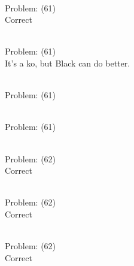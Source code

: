 \documentclass[11pt]{article}
\begin{document}
\begin{minipage}[t]{0.5\textwidth}
  {\centering
  
\\
Problem: (61)\\
Correct\\
  }
\end{minipage}
\begin{minipage}[t]{0.5\textwidth}
  {\centering
  
\\
Problem: (61)\\
It's a ko, but Black can do better.\\
  }
\end{minipage}
\begin{minipage}[t]{0.5\textwidth}
  {\centering
  
\\
Problem: (61)\\
  }
\end{minipage}
\begin{minipage}[t]{0.5\textwidth}
  {\centering
  
\\
Problem: (61)\\
  }
\end{minipage}
\begin{minipage}[t]{0.5\textwidth}
  {\centering
  
\\
Problem: (62)\\
Correct\\
  }
\end{minipage}
\begin{minipage}[t]{0.5\textwidth}
  {\centering
  
\\
Problem: (62)\\
Correct\\
  }
\end{minipage}
\begin{minipage}[t]{0.5\textwidth}
  {\centering
  
\\
Problem: (62)\\
Correct\\
  }
\end{minipage}
\end{document}
